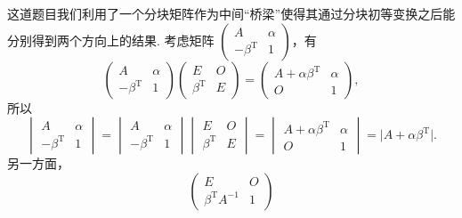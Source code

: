 \documentclass[UTF8,12pt,a4paper,fontset=fandol]{ctexart}
\begin{document}
\begin{solve}
这道题目我们利用了一个分块矩阵作为中间``桥梁''使得其通过分块初等变换之后能分别得到两个方向上的结果. 考虑矩阵 $\begin{pmatrix}
                A                   & \alpha \\
                -\beta^{\mathrm{T}} & 1
            \end{pmatrix}$，有
            \[\begin{pmatrix}
                    A                   & \alpha \\
                    -\beta^{\mathrm{T}} & 1
                \end{pmatrix} \begin{pmatrix}
                    E                  & O \\
                    \beta^{\mathrm{T}} & E
                \end{pmatrix} = \begin{pmatrix}
                    A+\alpha \beta^{\mathrm{T}} & \alpha \\
                    O                           & 1
                \end{pmatrix},\]
            所以
            \[\begin{vmatrix}
                    A                   & \alpha \\
                    -\beta^{\mathrm{T}} & 1
                \end{vmatrix} = \begin{vmatrix}
                    A                   & \alpha \\
                    -\beta^{\mathrm{T}} & 1
                \end{vmatrix} \begin{vmatrix}
                    E                  & O \\
                    \beta^{\mathrm{T}} & E
                \end{vmatrix} = \begin{vmatrix}
                    A+\alpha \beta^{\mathrm{T}} & \alpha \\
                    O                           & 1
                \end{vmatrix} = \lvert A+\alpha \beta^{\mathrm{T}} \rvert.\]
            另一方面，
            \[\begin{pmatrix}
                    E                        & O \\
                    \beta^{\mathrm{T}}A^{-1} & 1

\end{pmatrix}\]
\end{solve}
\end{document}
